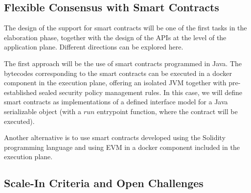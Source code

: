 \subsection{Flexible Consensus with Smart Contracts}



The design of the support for smart contracts will be one of the first tasks in the elaboration phase, together with the design of the APIs at the level of the application plane. Different directions can be explored here.

The first approach will be the use of smart contracts programmed in Java. The bytecodes corresponding to the smart contracts can be executed in a docker component in the execution plane, offering an isolated JVM \cite{jvm} together with pre-established sealed security policy management rules. In this case, we will define smart contracts as implementations of a defined interface model for a Java serializable object (with a $run$ entrypoint function, where the contract will be executed).

Another alternative is to use smart contracts developed using the Solidity programming language \cite{solidity} and using EVM \cite{evm} in a docker component included in the execution plane.


\subsection{Scale-In Criteria and Open Challenges}


